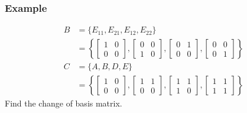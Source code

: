 \documentclass{math}
\begin{document}
\subsubsection*{Example}
\begin{align*}
  B &= \{E_{11},E_{21},E_{12},E_{22}\} \\
  &= \left\{
    \begin{bmatrix}1 & 0 \\ 0 & 0\end{bmatrix},
    \begin{bmatrix}0 & 0 \\ 1 & 0\end{bmatrix},
    \begin{bmatrix}0 & 1 \\ 0 & 0\end{bmatrix},
    \begin{bmatrix}0 & 0 \\ 0 & 1\end{bmatrix}
  \right\} \\
  C &= \{A,B,D,E\} \\
  &= \left\{
    \begin{bmatrix}1 & 0 \\ 0 & 0\end{bmatrix},
    \begin{bmatrix}1 & 1 \\ 0 & 0\end{bmatrix},
    \begin{bmatrix}1 & 1 \\ 1 & 0\end{bmatrix},
    \begin{bmatrix}1 & 1 \\ 1 & 1\end{bmatrix}
  \right\}
\end{align*}
Find the change of basis matrix.
\end{document}
